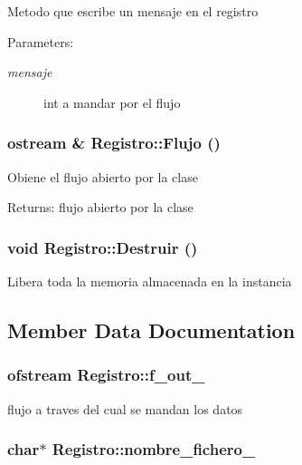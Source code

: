 Metodo que escribe un mensaje en el registro \begin{Desc}
\item[Parameters:]
\begin{description}
\item[{\em mensaje}]int a mandar por el flujo \end{description}
\end{Desc}
\subsubsection{\setlength{\rightskip}{0pt plus 5cm}ostream \& Registro::Flujo ()}\label{classRegistro_a3beb0de20dc0421628ff7396d2f76f5}


Obiene el flujo abierto por la clase \begin{Desc}
\item[Returns:]flujo abierto por la clase \end{Desc}
\subsubsection{\setlength{\rightskip}{0pt plus 5cm}void Registro::Destruir ()}\label{classRegistro_44c7aa629b33647372b95d8e32f856c7}


Libera toda la memoria almacenada en la instancia 

\subsection{Member Data Documentation}
\subsubsection{\setlength{\rightskip}{0pt plus 5cm}ofstream {\bf Registro::f\_\-out\_\-}\hspace{0.3cm}{\tt  [private]}}\label{classRegistro_2b8b1307bcd751f3b004519c51bcf497}


flujo a traves del cual se mandan los datos 

\subsubsection{\setlength{\rightskip}{0pt plus 5cm}char$\ast$ {\bf Registro::nombre\_\-fichero\_\-}\hspace{0.3cm}{\tt  [private]}}\label{classRegistro_ae3b307bfdfc9572595109242b62059c}


